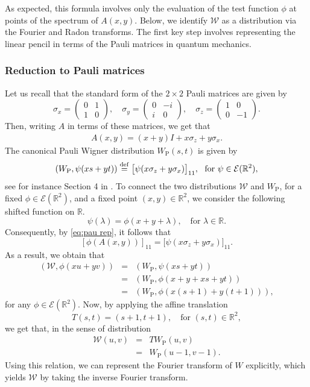 \documentclass[11pt,reqno]{amsart}
\theoremstyle{plain}
\theoremstyle{definition}
\numberwithin{equation}{section}
\newcommand{\R}{\mathbb{R}}
\newcommand{\beas}{\begin{eqnarray*}}
\newcommand{\eeas}{\end{eqnarray*}}
\newcommand{\bea} {\begin{eqnarray}}
\newcommand{\eea} {\end{eqnarray}}
\newcommand{\bydef}{\stackrel{\rm def}{=}}
\begin{document}
As expected, this formula involves only the evaluation of the test function $\phi$ at points of the spectrum of $A(x,y)$. Below, we identify $\mathcal{W}$ as a distribution via the Fourier and Radon transforms. The first key step involves representing the linear pencil in terms of the Pauli matrices in quantum mechanics.

\vspace{2mm}

\subsubsection{Reduction to Pauli matrices}
Let us recall that the standard form of the $2\times 2$ Pauli matrices are given by
$$
\sigma_x = \begin{pmatrix} 0 & 1 \\ 1 & 0 \end{pmatrix}, \quad
\sigma_y = \begin{pmatrix} 0 & -i \\ i & 0 \end{pmatrix}, \quad
\sigma_z = \begin{pmatrix} 1 & 0 \\ 0 & -1 \end{pmatrix}.
$$
Then, writing $A$ in terms of these matrices, we get that 
\bea\label{eq:pau rep}
A(x,y)=(x+y)I+x\sigma_z+y\sigma_x.
\eea
{The canonical Pauli Wigner distribution $W_{\mathrm P}(s,t)$ is given by
$$
( W_{\mathrm P}, \psi(xs+yt) )
\bydef
\bigl[\psi(x\sigma_z+y\sigma_x)\bigr]_{11}, \ \  \text{for } \psi\in\mathcal E(\R^2),
$$} see for instance Section 4 in \cite{Anderson}.
To connect the two distributions $\mathcal{W}$ and $W_\mathrm P$, for a fixed $\phi\in \mathcal E(\R^2)$, and a fixed point $(x,y)\in\R^2$, we consider the following shifted function on $\R$.
\[
\psi(\lambda)=\phi(x+y+\lambda),\quad\text{for }\lambda\in\R.
\]
Consequently, by \eqref{eq:pau rep}, it follows that
\[
[\phi(A(x,y))]_{11}=\bigl[\psi(x\sigma_z+y\sigma_x)\bigr]_{11}.
\]
As a result, we obtain that
\beas
( \mathcal{W},\phi(xu+yv)) &=&( W_{\mathrm P},\psi(xs+yt) )\\
&=& ( W_{\mathrm{P}}, \phi(x+y+xs+yt) )\\
&=& ( W_{\mathrm{P}}, \phi(x(s+1)+y(t+1)) ),
\eeas
for any $\phi\in \mathcal E(\R^2)$.
Now, by applying the affine translation 
$$
T(s,t)=(s+1,t+1),\quad \text{for }(s,t)\in\R^2,
$$
we get that, in the sense of distribution
\bea\label{eq:final form}
\nonumber \mathcal{W}(u,v) &=& TW_{\mathrm P}(u,v)\\
&=& W_{\mathrm P}(u-1,v-1).
\eea
Using this relation, we can represent the Fourier transform of $W$ explicitly, which yields $\mathcal W$ by taking the inverse Fourier transform.
\vspace{2mm}
\end{document}
